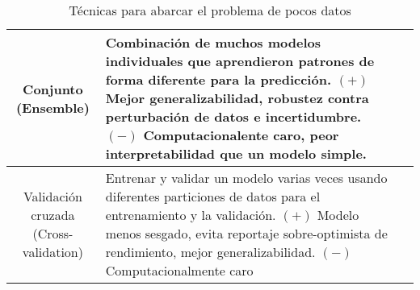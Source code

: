 \begin{center}
\begin{table}[h!]
\begin{tabular}{ |c|m{9.5cm}|c| }
            \hline
            Conjunto (Ensemble) & Combinación de muchos modelos individuales que aprendieron patrones de forma
            diferente para la predicción. $(+)$ Mejor generalizabilidad, robustez contra perturbación de datos e
            incertidumbre. $(-)$ Computacionalente caro, peor interpretabilidad que un modelo simple. &
            \autocite{safonova-2023,langkvist-2016,pritt-2017} \\
            \hline
            \makecell{Validación cruzada \\ (Cross-validation)} & Entrenar y validar un modelo varias veces usando
            diferentes particiones de datos para el entrenamiento y la validación. $(+)$ Modelo menos sesgado, evita
            reportaje sobre-optimista de rendimiento, mejor generalizabilidad. $(-)$ Computacionalmente caro &
            \autocite{safonova-2023} \\
            \hline
        \end{tabular}
        \caption{Técnicas para abarcar el problema de pocos datos}
        \label{table:3}
    \end{table}
    \vspace{-\topsep}
\end{center}

